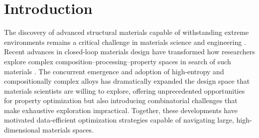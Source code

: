 \section{Introduction}\label{sec:Intro} 





The discovery of advanced structural materials capable of withstanding extreme environments remains a critical challenge in materials science and engineering \cite{}.  Recent advances in closed-loop materials design have transformed how researchers explore complex composition–processing–property spaces in search of such materials  \cite{}. The concurrent emergence and adoption of high-entropy and compositionally complex alloys has dramatically expanded the design space that materials scientists are willing to explore, offering unprecedented opportunities for property optimization but also introducing combinatorial challenges that make exhaustive exploration impractical. Together, these developments have motivated data-efficient optimization strategies capable of navigating large, high-dimensional materials spaces.



